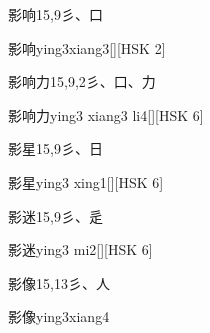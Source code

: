 \begin{Entry}{影响}{15,9}{⼺、⼝}
  \begin{Phonetics}{影响}{ying3xiang3}[][HSK 2]
  \end{Phonetics}
\end{Entry}

\begin{Entry}{影响力}{15,9,2}{⼺、⼝、⼒}
  \begin{Phonetics}{影响力}{ying3 xiang3 li4}[][HSK 6]
  \end{Phonetics}
\end{Entry}

\begin{Entry}{影星}{15,9}{⼺、⽇}
  \begin{Phonetics}{影星}{ying3 xing1}[][HSK 6]
  \end{Phonetics}
\end{Entry}

\begin{Entry}{影迷}{15,9}{⼺、⾡}
  \begin{Phonetics}{影迷}{ying3 mi2}[][HSK 6]
  \end{Phonetics}
\end{Entry}

\begin{Entry}{影像}{15,13}{⼺、⼈}
  \begin{Phonetics}{影像}{ying3xiang4}
  \end{Phonetics}
\end{Entry}


